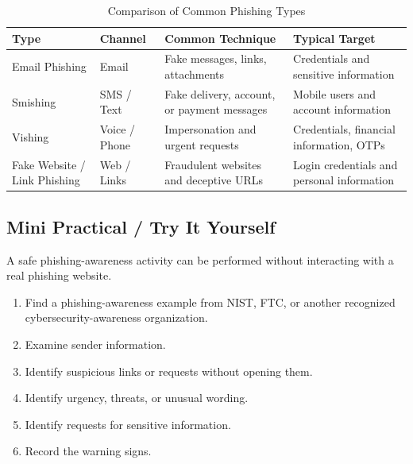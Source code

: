 \documentclass[12pt,a4paper]{article}
\begin{document}
\begin{table}[H]
\centering
\small
\renewcommand{\arraystretch}{1.25}

\begin{tabularx}{\textwidth}{
|p{2.4cm}|p{2.2cm}|X|X|
}
\hline

\textbf{Type}
&
\textbf{Channel}
&
\textbf{Common Technique}
&
\textbf{Typical Target}
\\
\hline

Email Phishing
&
Email
&
Fake messages, links, attachments
&
Credentials and sensitive information
\\
\hline

Smishing
&
SMS / Text
&
Fake delivery, account, or payment messages
&
Mobile users and account information
\\
\hline

Vishing
&
Voice / Phone
&
Impersonation and urgent requests
&
Credentials, financial information, OTPs
\\
\hline

Fake Website / Link Phishing
&
Web / Links
&
Fraudulent websites and deceptive URLs
&
Login credentials and personal information
\\
\hline

\end{tabularx}

\caption{Comparison of Common Phishing Types}

\end{table}


\subsection{Mini Practical / Try It Yourself}

A safe phishing-awareness activity can be performed without interacting with a real phishing website.

\begin{enumerate}
    \item Find a phishing-awareness example from NIST, FTC, or another recognized cybersecurity-awareness organization.
    \item Examine sender information.
    \item Identify suspicious links or requests without opening them.
    \item Identify urgency, threats, or unusual wording.
    \item Identify requests for sensitive information.
    \item Record the warning signs.
\end{enumerate}
\end{document}

